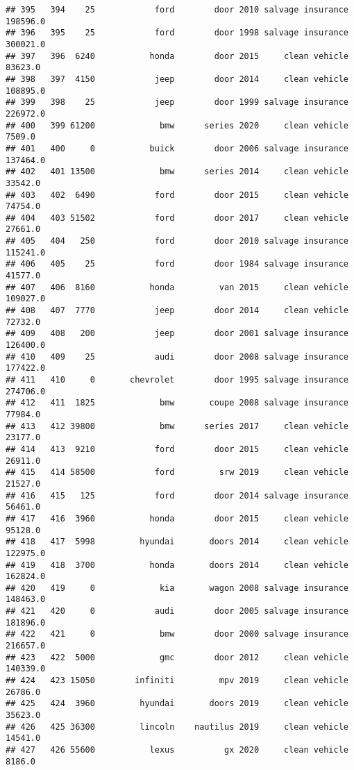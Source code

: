 \documentclass[
]{article}
\begin{document}
\begin{verbatim}
## 395   394    25            ford        door 2010 salvage insurance  198596.0
## 396   395    25            ford        door 1998 salvage insurance  300021.0
## 397   396  6240           honda        door 2015     clean vehicle   83623.0
## 398   397  4150            jeep        door 2014     clean vehicle  108895.0
## 399   398    25            jeep        door 1999 salvage insurance  226972.0
## 400   399 61200             bmw      series 2020     clean vehicle    7509.0
## 401   400     0           buick        door 2006 salvage insurance  137464.0
## 402   401 13500             bmw      series 2014     clean vehicle   33542.0
## 403   402  6490            ford        door 2015     clean vehicle   74754.0
## 404   403 51502            ford        door 2017     clean vehicle   27661.0
## 405   404   250            ford        door 2010 salvage insurance  115241.0
## 406   405    25            ford        door 1984 salvage insurance   41577.0
## 407   406  8160           honda         van 2015     clean vehicle  109027.0
## 408   407  7770            jeep        door 2014     clean vehicle   72732.0
## 409   408   200            jeep        door 2001 salvage insurance  126400.0
## 410   409    25            audi        door 2008 salvage insurance  177422.0
## 411   410     0       chevrolet        door 1995 salvage insurance  274706.0
## 412   411  1825             bmw       coupe 2008 salvage insurance   77984.0
## 413   412 39800             bmw      series 2017     clean vehicle   23177.0
## 414   413  9210            ford        door 2015     clean vehicle   26911.0
## 415   414 58500            ford         srw 2019     clean vehicle   21527.0
## 416   415   125            ford        door 2014 salvage insurance   56461.0
## 417   416  3960           honda        door 2015     clean vehicle   95128.0
## 418   417  5998         hyundai       doors 2014     clean vehicle  122975.0
## 419   418  3700           honda       doors 2014     clean vehicle  162824.0
## 420   419     0             kia       wagon 2008 salvage insurance  148463.0
## 421   420     0            audi        door 2005 salvage insurance  181896.0
## 422   421     0             bmw        door 2000 salvage insurance  216657.0
## 423   422  5000             gmc        door 2012     clean vehicle  140339.0
## 424   423 15050        infiniti         mpv 2019     clean vehicle   26786.0
## 425   424  3960         hyundai       doors 2019     clean vehicle   35623.0
## 426   425 36300         lincoln    nautilus 2019     clean vehicle   14541.0
## 427   426 55600           lexus          gx 2020     clean vehicle    8186.0

\end{verbatim}
\end{document}

